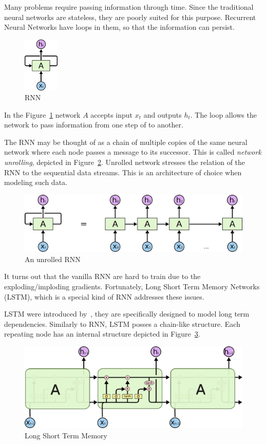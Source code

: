 \documentclass{article}
\begin{document}
Many problems require passing information through time.  Since the
traditional neural networks are stateless, they are poorly suited for
this purpose. Recurrent Neural Networks have loops in them, so that
the information can persist.

\begin{figure}[h!]
  \centering \includegraphics[width=0.15\textwidth]{RNN-rolled}
  \caption{RNN}
  \label{fig:rnn1}  
\end{figure}

In the Figure~\ref{fig:rnn1} network $A$ accepts input $x_t$ and
outputs $h_t$.  The loop allows the network to pass information from
one step of to another.

The RNN may be thought of as a chain of multiple copies of the same
neural network where each node passes a message to its successor.
This is called \textit{network unrolling}, depicted in
Figure~\ref{fig:rnn2}.  Unrolled network stresses the relation of the
RNN to the sequential data streams.  This is an architecture of choice
when modeling such data.

\begin{figure}[ht!]
  \centering \includegraphics[width=.7\textwidth]{RNN-unrolled}
  \caption{An unrolled RNN}\label{fig:rnn2}
\end{figure}

It turns out that the vanilla RNN are hard to train due to the
exploding/imploding gradients.  Fortunately, Long Short Term Memory
Networks (LSTM), which is a special kind of RNN addresses these issues.

LSTM were introduced by~\cite{hochreiter1997long}, they are
specifically designed to model long term dependencies. Similarly to
RNN, LSTM posses a chain-like structure. Each repeating node has an
internal structure depicted in Figure~\ref{fig:lstm1}.

\begin{figure}[ht!]
  \centering \includegraphics[width=.7\textwidth]{LSTM3-chain}
  \caption{Long Short Term Memory}\label{fig:lstm1}
\end{figure}
\end{document}

